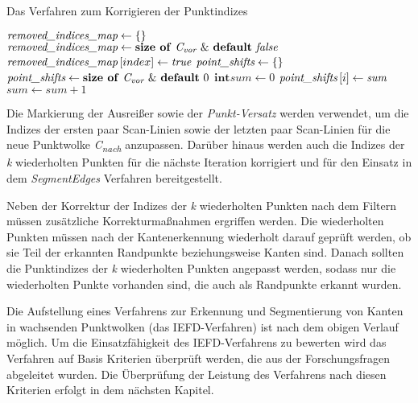 \begin{algorithm}[!b]
	\caption{Das Verfahren zum Korrigieren der Punktindizes}
	\label{alg: mark_points}
	\begin{algorithmic}[1]
		\State $\textit{removed\textunderscore indices\textunderscore map} \gets \text{\{\}}$
		\State $\textit{removed\textunderscore indices\textunderscore map} \gets \text{\textbf{size of} \textit{C\textsubscript{vor}} \& \textbf{default} \textit{false}}$
		\State $\textit{removed\textunderscore indices\textunderscore map} \left[index\right] \gets \textit{true}$
		\EndFor
		\State $\textit{point\textunderscore shifts} \gets \text{\{\}}$
		\State $\textit{point\textunderscore shifts} \gets \text{\textbf{size of} \textit{C\textsubscript{vor}} \& \textbf{default} 0}$
		\State $\textbf{int} \textit{sum} \gets 0$
		\State $\textit{point\textunderscore shifts}\left[i\right] \gets \textit{sum}$
		\Else
		\State $\textit{sum} \gets \textit{sum} + 1$
		\EndIf
		\EndFor
		\EndFunction
	\end{algorithmic}
\end{algorithm}

Die Markierung der Ausreißer sowie der \textit{Punkt-Versatz} werden verwendet, um die Indizes der ersten paar Scan-Linien sowie der letzten paar Scan-Linien für die neue Punktwolke \textit{C\textsubscript{nach}} anzupassen. Darüber hinaus werden auch die Indizes der \textit{k} wiederholten Punkten für die nächste Iteration korrigiert und für den Einsatz in dem \textit{SegmentEdges} Verfahren bereitgestellt. 

Neben der Korrektur der Indizes der \textit{k} wiederholten Punkten nach dem Filtern müssen zusätzliche Korrekturmaßnahmen ergriffen werden. Die wiederholten Punkten müssen nach der Kantenerkennung wiederholt darauf geprüft werden, ob sie Teil der erkannten Randpunkte beziehungsweise Kanten sind. Danach sollten die Punktindizes der \textit{k} wiederholten Punkten angepasst werden, sodass nur die wiederholten Punkte vorhanden sind, die auch als Randpunkte erkannt wurden. 

Die Aufstellung eines Verfahrens zur Erkennung und Segmentierung von Kanten in wachsenden Punktwolken (das IEFD-Verfahren) ist nach dem obigen Verlauf möglich. Um die Einsatzfähigkeit des IEFD-Verfahrens zu bewerten wird das Verfahren auf Basis Kriterien überprüft werden, die aus der Forschungsfragen abgeleitet wurden. Die Überprüfung der Leistung des Verfahrens nach diesen Kriterien erfolgt in dem nächsten Kapitel.
